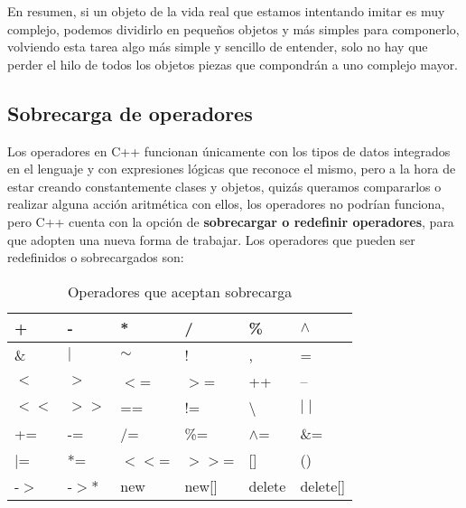 En resumen, si un objeto de la vida real que estamos intentando imitar es muy complejo, podemos dividirlo en pequeños objetos y más simples para componerlo, volviendo esta tarea algo más simple y sencillo de entender, solo no hay que perder el hilo de todos los objetos piezas que compondrán a uno complejo mayor.


\subsection{Sobrecarga de operadores}
\hspace{0.55cm}Los operadores en C++ funcionan únicamente con los tipos de datos integrados en el lenguaje y con expresiones lógicas que reconoce el mismo, pero a la hora de estar creando constantemente clases y objetos, quizás queramos compararlos o realizar alguna acción aritmética con ellos, los operadores no podrían funciona, pero C++ cuenta con la opción de \textbf{sobrecargar o redefinir operadores}, para que adopten una nueva forma de trabajar. Los operadores que pueden ser redefinidos o sobrecargados son:
\begin{table}[H]
    \begin{center}
        \caption{Operadores que aceptan sobrecarga}
        \label{tab: 8}
        \begin{tabular}{|l|l|l|l|l|l|}
            \hline
            +       & -         & *         & /     & \%                & $\wedge$ \\
            \hline
            \&      & $\mid$    & $\sim$    & !     & ,                 & = \\
            \hline
            $<$     & $>$       & $<$=      & $>$=  & ++                & -- \\
            \hline
            $<<$    & $>>$      & ==        & !=    & \textbackslash    & $\mid\mid$ \\
            \hline
            +=      & -=        & /=        & \%=   & $\wedge$=         & \&= \\
            \hline
            $\mid$= & *=        & $<<$=     & $>>$= & []                & () \\
            \hline
            -$>$    & -$>$*     & new       & new[] & delete            & delete[] \\
            \hline
        \end{tabular}
    \end{center}
\end{table}

